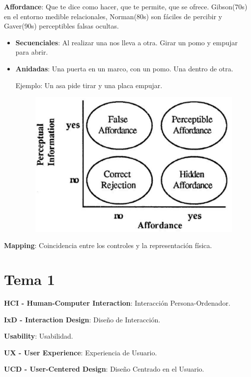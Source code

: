 \documentclass[12pt]{report} %
\begin{document}
\textbf{Affordance}: Que te dice como hacer, que te permite, que se
ofrece. Gibson(70s) en el entorno medible relacionales, Norman(80s) son
fáciles de percibir y Gaver(90s) perceptibles falsas ocultas.

\begin{itemize}
\item
  \textbf{Secuenciales}: Al realizar una nos lleva a otra. Girar un pomo
  y empujar para abrir.
\item
  \textbf{Anidadas}: Una puerta en un marco, con un pomo. Una dentro de
  otra.

  Ejemplo: Un asa pide tirar y una placa empujar.
  \begin{figure}[H]
	{\includegraphics[scale=.4]{Untitled.png}}
\end{figure}
\end{itemize}

\textbf{Mapping}: Coincidencia entre los controles y la representación
física.

\hypertarget{tema-1}{%
\chapter{Tema 1}\label{tema-1}}

\textbf{HCI - Human-Computer Interaction}: Interacción
Persona-Ordenador.

\textbf{IxD - Interaction Design}: Diseño de Interacción.

\textbf{Usability}: Usabilidad.

\textbf{UX - User Experience}: Experiencia de Usuario.

\textbf{UCD - User-Centered Design}: Diseño Centrado en el Usuario.
\end{document}
